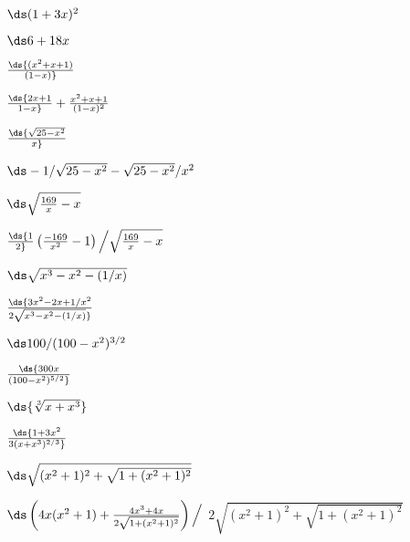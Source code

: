 \begin{exercises}
\begin{exercise} $\ds (1+3x)^2$
\begin{answer} $\ds  6+18x$
\end{answer}\end{exercise}

\begin{exercise} $\ds{(x^2+x+1)\over(1-x)}$
\begin{answer} $\ds {2 x + 1\over1 - x }+{x^2  + x + 1\over(1 - x)^2}$
\end{answer}\end{exercise}

\begin{exercise} $\ds{\sqrt{25-x^2}\over x}$
\begin{answer} $\ds  -1/\sqrt{25-x^2}-\sqrt{25-x^2}/x^2$
\end{answer}\end{exercise}

\begin{exercise} $\ds\sqrt{{169\over x}-x}$
\begin{answer} $\ds{1\over2}\left({-169\over x^2}-1\right)\Big/\sqrt{{169\over x}-x}$
\end{answer}\end{exercise}

\begin{exercise} $\ds \sqrt{x^3-x^2-(1/x)}$
\begin{answer} $ \ds{3x^2-2x+1/x^2\over 2\sqrt{x^3-x^2-(1/x)}}$
\end{answer}\end{exercise}

\begin{exercise} $\ds 100/(100-x^2)^{3/2}$
\begin{answer} $ \ds{300 x \over(100-x^2)^{5/2}}$
\end{answer}\end{exercise}

\begin{exercise} $\ds {\root 3 \of{x+x^3}}$
\begin{answer} $ \ds{ 1 + 3 x^2\over3(x+x^3)^{2/3}}$
\end{answer}\end{exercise}

\begin{exercise} $\ds \sqrt{(x^2+1)^2+\sqrt{1+(x^2+1)^2}}$
\begin{answer} $ \ds \left(4x(x^2+1)+{4x^3+4x\over2\sqrt{1+(x^2+1)^2}}\right)\Big/$
\hfill\break$2\sqrt{(x^2+1)^2+\sqrt{1+(x^2+1)^2}}$
\end{answer}\end{exercise}


\end{exercises}
